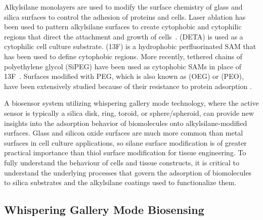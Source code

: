 Alkylsilane monolayers are used to modify the surface chemistry of
glass and silica surfaces to control the adhesion of proteins and
cells. Laser ablation has been used to pattern alkylsilane surfaces
to create cytophobic and cytophilic regions that direct the attachment
and growth of cells~\cite{Stenger1992}. 
(DETA) is used as a cytophilic cell culture substrate. 
(13F) is a hydrophobic perfluorinated SAM that has been used to define
cytophobic regions. More recently, tethered chains of polyethylene
glycol (SiPEG) have been used as cytophobic SAMs in place of 13F~\cite{Wilson2011a}.
Surfaces modified with PEG, which is also known as 
(OEG) or  (PEO), have been extensively
studied because of their resistance to protein adsorption \cite{Gombotz1991}.

A biosensor system utilizing whispering gallery mode technology, where
the active sensor is typically a silica disk, ring, toroid, or sphere/spheroid,
can provide new insights into the adsorption behavior of biomolecules
onto alkylsilane-modified surfaces. Glass and silicon oxide surfaces
are much more common than metal surfaces in cell culture applications,
so silane surface modification is of greater practical importance
than thiol surface modification for tissue engineering. To fully understand
the behaviour of cells and tissue constructs, it is critical to understand
the underlying processes that govern the adsorption of biomolecules
to silica substrates and the alkylsilane coatings used to functionalize
them.


\subsection{Whispering Gallery Mode Biosensing}

